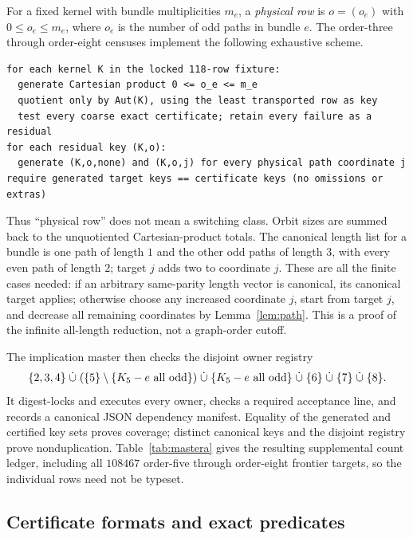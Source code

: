 \documentclass[11pt]{article}
\theoremstyle{remark}
\begin{document}
For a fixed kernel with bundle multiplicities $m_e$, a \emph{physical row} is
$o=(o_e)$ with $0\le o_e\le m_e$, where $o_e$ is the number of odd paths in
bundle $e$.  The order-three through order-eight censuses implement the
following exhaustive scheme.
\begin{verbatim}
for each kernel K in the locked 118-row fixture:
  generate Cartesian product 0 <= o_e <= m_e
  quotient only by Aut(K), using the least transported row as key
  test every coarse exact certificate; retain every failure as a residual
for each residual key (K,o):
  generate (K,o,none) and (K,o,j) for every physical path coordinate j
require generated target keys == certificate keys (no omissions or extras)
\end{verbatim}
Thus ``physical row'' does not mean a switching class.  Orbit sizes are summed
back to the unquotiented Cartesian-product totals.  The canonical length list
for a bundle is one path of length $1$ and the other odd paths of length $3$,
with every even path of length $2$; target $j$ adds two to coordinate $j$.
These are all the finite cases needed: if an arbitrary same-parity length vector
is canonical, its canonical target applies; otherwise choose any increased
coordinate $j$, start from target $j$, and decrease all remaining coordinates
by Lemma~\ref{lem:path}.  This is a proof of the infinite all-length reduction,
not a graph-order cutoff.

The implication master then checks the disjoint owner registry
\[
 \{2,3,4\}\;\dot\cup\;(\{5\}\setminus\{K_5-e\hbox{ all odd}\})
 \;\dot\cup\;\{K_5-e\hbox{ all odd}\}\;\dot\cup\;\{6\}\;\dot\cup\;\{7\}
 \;\dot\cup\;\{8\}.
\]
It digest-locks and executes every owner, checks a required acceptance line,
and records a canonical JSON dependency manifest.  Equality of the generated
and certified key sets proves coverage; distinct canonical keys and the
disjoint registry prove nonduplication.  Table~\ref{tab:mastera} gives the
resulting supplemental count ledger, including all $108467$ order-five through
order-eight frontier targets, so the individual rows need not be typeset.

\subsection{Certificate formats and exact predicates}
\end{document}
